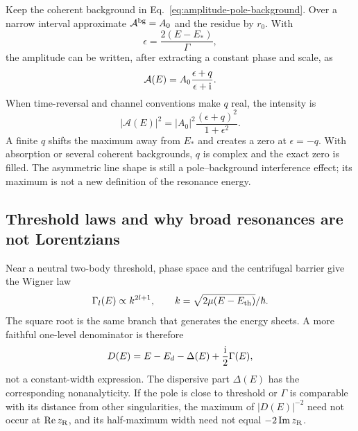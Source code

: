 Keep the coherent background in
Eq.~\eqref{eq:amplitude-pole-background}.  Over a narrow interval approximate
$\mathcal A^{\mathrm{bg}}=A_0$ and the residue by $r_0$.  With
\begin{equation}
  \epsilon=\frac{2(E-E_*)}{\Gamma},
  \label{eq:fano-reduced-energy}
\end{equation}
the amplitude can be written, after extracting a constant phase and scale,
as
\begin{equation}
  \mathcal A(E)
  =A_0\frac{\epsilon+q}{\epsilon+\mathrm{i}}.
  \label{eq:fano-amplitude}
\end{equation}
When time-reversal and channel conventions make $q$ real, the intensity is
\begin{equation}
  |\mathcal A(E)|^2
  =|A_0|^2\frac{(\epsilon+q)^2}{1+\epsilon^2}.
  \label{eq:fano-profile}
\end{equation}
A finite $q$ shifts the maximum away from $E_*$ and creates a zero at
$\epsilon=-q$.  With absorption or several coherent backgrounds, $q$ is
complex and the exact zero is filled.  The asymmetric line shape is still a
pole--background interference effect; its maximum is not a new definition of
the resonance energy.

\subsection{Threshold laws and why broad resonances are not Lorentzians}
\label{subsec:threshold-resonance-formula}

Near a neutral two-body threshold, phase space and the centrifugal barrier
give the Wigner law
\begin{equation}
  \Gamma_l(E)
  \propto k^{2l+1},
  \qquad
  k=\sqrt{2\mu(E-E_{\mathrm{th}})}/\hbar.
  \label{eq:wigner-width-law}
\end{equation}
The square root is the same branch that generates the energy sheets.  A more
faithful one-level denominator is therefore
\begin{equation}
  D(E)=E-E_d-\Delta(E)+\frac{\mathrm{i}}{2}\Gamma(E),
  \label{eq:energy-dependent-resonance-denominator}
\end{equation}
not a constant-width expression.  The dispersive part $\Delta(E)$ has the
corresponding nonanalyticity.  If the pole is close to threshold or
$\Gamma$ is comparable with its distance from other singularities, the
maximum of $|D(E)|^{-2}$ need not occur at $\operatorname{Re} z_{\mathrm R}$, and its
half-maximum width need not equal $-2\operatorname{Im} z_{\mathrm R}$.

